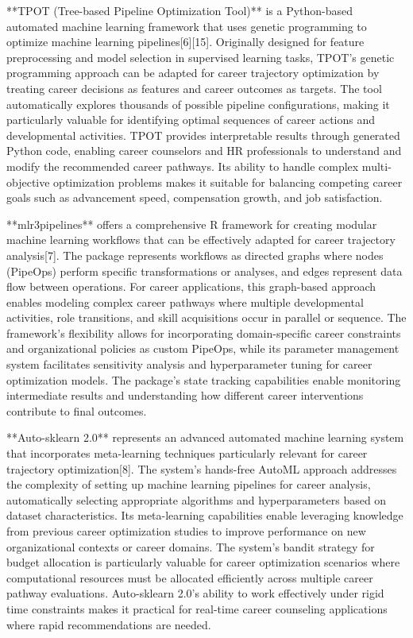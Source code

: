 \documentclass[main.tex]{subfiles}
\begin{document}
**TPOT (Tree-based Pipeline Optimization Tool)** is a Python-based automated machine learning framework that uses genetic programming to optimize machine learning pipelines[6][15]. Originally designed for feature preprocessing and model selection in supervised learning tasks, TPOT's genetic programming approach can be adapted for career trajectory optimization by treating career decisions as features and career outcomes as targets. The tool automatically explores thousands of possible pipeline configurations, making it particularly valuable for identifying optimal sequences of career actions and developmental activities. TPOT provides interpretable results through generated Python code, enabling career counselors and HR professionals to understand and modify the recommended career pathways. Its ability to handle complex multi-objective optimization problems makes it suitable for balancing competing career goals such as advancement speed, compensation growth, and job satisfaction.

**mlr3pipelines** offers a comprehensive R framework for creating modular machine learning workflows that can be effectively adapted for career trajectory analysis[7]. The package represents workflows as directed graphs where nodes (PipeOps) perform specific transformations or analyses, and edges represent data flow between operations. For career applications, this graph-based approach enables modeling complex career pathways where multiple developmental activities, role transitions, and skill acquisitions occur in parallel or sequence. The framework's flexibility allows for incorporating domain-specific career constraints and organizational policies as custom PipeOps, while its parameter management system facilitates sensitivity analysis and hyperparameter tuning for career optimization models. The package's state tracking capabilities enable monitoring intermediate results and understanding how different career interventions contribute to final outcomes.

**Auto-sklearn 2.0** represents an advanced automated machine learning system that incorporates meta-learning techniques particularly relevant for career trajectory optimization[8]. The system's hands-free AutoML approach addresses the complexity of setting up machine learning pipelines for career analysis, automatically selecting appropriate algorithms and hyperparameters based on dataset characteristics. Its meta-learning capabilities enable leveraging knowledge from previous career optimization studies to improve performance on new organizational contexts or career domains. The system's bandit strategy for budget allocation is particularly valuable for career optimization scenarios where computational resources must be allocated efficiently across multiple career pathway evaluations. Auto-sklearn 2.0's ability to work effectively under rigid time constraints makes it practical for real-time career counseling applications where rapid recommendations are needed.
\end{document}
